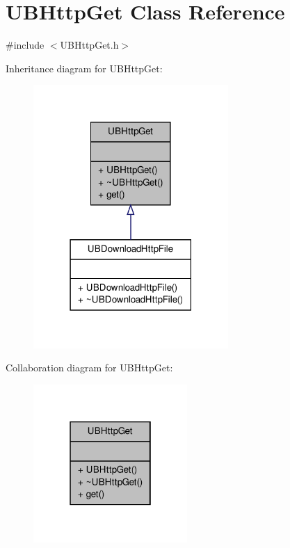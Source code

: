 \hypertarget{class_u_b_http_get}{\section{U\-B\-Http\-Get Class Reference}
\label{de/d40/class_u_b_http_get}
}


{\ttfamily \#include $<$U\-B\-Http\-Get.\-h$>$}



Inheritance diagram for U\-B\-Http\-Get\-:
\nopagebreak
\begin{figure}[H]
\begin{center}
\leavevmode
\includegraphics[width=210pt]{d3/dcf/class_u_b_http_get__inherit__graph}
\end{center}
\end{figure}


Collaboration diagram for U\-B\-Http\-Get\-:
\nopagebreak
\begin{figure}[H]
\begin{center}
\leavevmode
\includegraphics[width=166pt]{db/d4c/class_u_b_http_get__coll__graph}
\end{center}
\end{figure}
